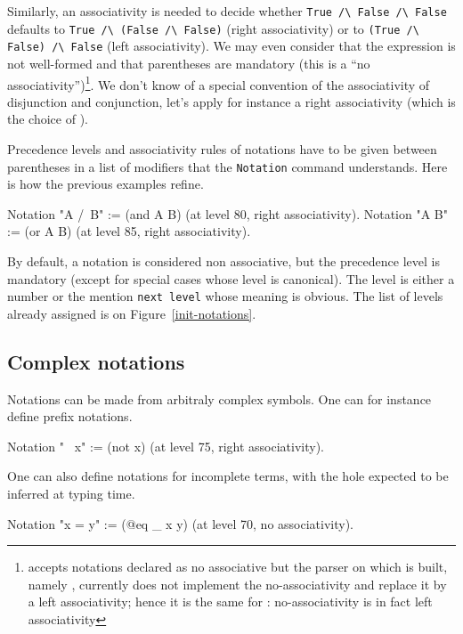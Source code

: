 Similarly, an associativity is needed to decide whether {\tt True \verb=/\=
False \verb=/\= False} defaults to {\tt True \verb=/\= (False
\verb=/\= False)} (right associativity) or to {\tt (True
\verb=/\= False) \verb=/\= False} (left associativity). We may
even consider that the expression is not well-formed and that
parentheses are mandatory (this is a ``no associativity'')\footnote{
{\Coq} accepts notations declared as no associative but the parser on
which {\Coq} is built, namely {\camlpppp}, currently does not implement the
no-associativity and replace it by a left associativity; hence it is
the same for {\Coq}: no-associativity is in fact left associativity}.
We don't know of a special convention of the associativity of
disjunction and conjunction, let's apply for instance a right
associativity (which is the choice of {\Coq}).

Precedence levels and associativity rules of notations have to be
given between parentheses in a list of modifiers that the
\texttt{Notation} command understands. Here is how the previous
examples refine.

\begin{coq_example*}
Notation "A /\ B" := (and A B) (at level 80, right associativity).
Notation "A \/ B" := (or A B)  (at level 85, right associativity).
\end{coq_example*}

By default, a notation is considered non associative, but the
precedence level is mandatory (except for special cases whose level is
canonical). The level is either a number or the mention {\tt next
level} whose meaning is obvious. The list of levels already assigned
is on Figure~\ref{init-notations}.

\subsection{Complex notations}

Notations can be made from arbitraly complex symbols. One can for
instance define prefix notations.

\begin{coq_example*}
Notation "~ x" := (not x) (at level 75, right associativity).
\end{coq_example*}

One can also define notations for incomplete terms, with the hole
expected to be inferred at typing time.

\begin{coq_example*}
Notation "x = y" := (@eq _ x y) (at level 70, no associativity).
\end{coq_example*}

